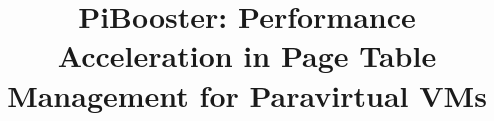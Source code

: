 \documentclass[10pt,preprint]{sigplanconf}
\begin{document}
\newcommand{\name}{PiBooster\xspace}
\newcommand{\cache}{PiBooster cache\xspace}
\newcommand{\module}{PiBooster module\xspace}
\newcommand{\eat}[1]{}  %
\newcommand{\authcomment}[3]{\textcolor{#3}{#1 says: #2}}\newcommand{\yueqiang}[1]{\authcomment{Yueqiang}{#1}{red}}
\newcommand{\zhi}[1]{\authcomment{Zhi}{#1}{red}}
\newcommand{\mypara}[1]{\vspace{2pt}\noindent\textbf{{#1. }}}


\date{}

\title{\Large \bf PiBooster: Performance Acceleration in Page Table Management for Paravirtual VMs}


\maketitle
\end{document}
